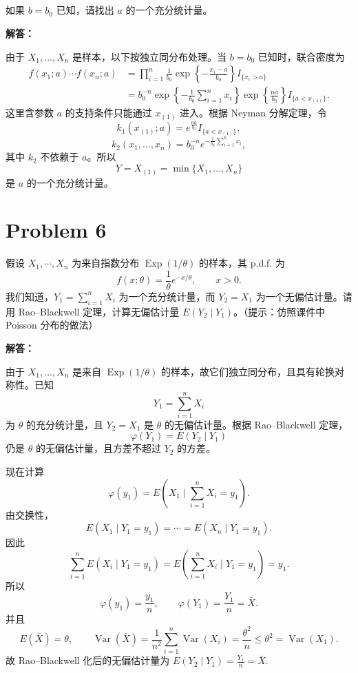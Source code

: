 \documentclass[12pt,a4paper]{article}
\begin{document}
\subsection{}

如果 $b=b_0$ 已知，请找出 $a$ 的一个充分统计量。

\begin{answerbox}
\textbf{解答：}

由于 $X_1,\ldots,X_n$ 是样本，以下按独立同分布处理。当 $b=b_0$ 已知时，联合密度为
\[
\begin{aligned}
f(x_1;a)\cdots f(x_n;a)
&=\prod_{i=1}^n\frac{1}{b_0}\exp\left\{-\frac{x_i-a}{b_0}\right\}I_{\{x_i>a\}}\\
&=b_0^{-n}\exp\left\{-\frac{1}{b_0}\sum_{i=1}^nx_i\right\}
\exp\left\{\frac{na}{b_0}\right\}I_{\{a<x_{(1)}\}}.
\end{aligned}
\]
这里含参数 $a$ 的支持条件只能通过 $x_{(1)}$ 进入。根据 Neyman 分解定理，令
\[
k_1(x_{(1)};a)=e^{\frac{na}{b_0}}I_{\{a<x_{(1)}\}},
\]
\[
k_2(x_1,\ldots,x_n)=b_0^{-n}e^{-\frac{1}{b_0}\sum_{i=1}^nx_i},
\]
其中 $k_2$ 不依赖于 $a$。所以
\[
Y=X_{(1)}=\min\{X_1,\ldots,X_n\}
\]
是 $a$ 的一个充分统计量。
\end{answerbox}

\section{Problem 6}

假设 $X_1,\cdots,X_n$ 为来自指数分布 $\operatorname{Exp}(1/\theta)$ 的样本，其 p.d.f. 为
\[
f(x;\theta)=\frac{1}{\theta}e^{-x/\theta},\qquad x>0.
\]
我们知道，$Y_1=\sum_{i=1}^{n}X_i$ 为一个充分统计量，而 $Y_2=X_1$ 为一个无偏估计量。请用 Rao--Blackwell 定理，计算无偏估计量 $E(Y_2\mid Y_1)$。（提示：仿照课件中 Poisson 分布的做法）

\begin{answerbox}
\textbf{解答：}

由于 $X_1,\ldots,X_n$ 是来自 $\operatorname{Exp}(1/\theta)$ 的样本，故它们独立同分布，且具有轮换对称性。已知
\[
Y_1=\sum_{i=1}^nX_i
\]
为 $\theta$ 的充分统计量，且 $Y_2=X_1$ 是 $\theta$ 的无偏估计量。根据 Rao--Blackwell 定理，
\[
\varphi(Y_1)=E(Y_2\mid Y_1)
\]
仍是 $\theta$ 的无偏估计量，且方差不超过 $Y_2$ 的方差。

现在计算
\[
\varphi(y_1)=E\left(X_1\mid \sum_{i=1}^nX_i=y_1\right).
\]
由交换性，
\[
E\left(X_1\mid Y_1=y_1\right)=\cdots=E\left(X_n\mid Y_1=y_1\right).
\]
因此
\[
\sum_{i=1}^nE(X_i\mid Y_1=y_1)
=E\left(\sum_{i=1}^nX_i\mid Y_1=y_1\right)
=y_1.
\]
所以
\[
\varphi(y_1)=\frac{y_1}{n},
\qquad
\varphi(Y_1)=\frac{Y_1}{n}=\bar X.
\]
并且
\[
E(\bar X)=\theta,
\qquad
\operatorname{Var}(\bar X)=\frac{1}{n^2}\sum_{i=1}^n\operatorname{Var}(X_i)=\frac{\theta^2}{n}\leq \theta^2=\operatorname{Var}(X_1).
\]
故 Rao--Blackwell 化后的无偏估计量为 $E(Y_2\mid Y_1)=\frac{Y_1}{n}=\bar X$.
\end{answerbox}
\end{document}
